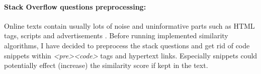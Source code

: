 \paragraph{Stack Overflow questions preprocessing:}  Online texts contain usually lots of noise and uninformative parts such as HTML tags, scripts and advertisements \cite{haddi2013role}. Before running implemented similarity algorithms, I have decided to preprocess the stack questions and get rid of code snippets within \textit{\textless pre\textgreater\textless code\textgreater} tags and hypertext links. Especially snippets could potentially effect (increase) the similarity score if kept in the text.

	